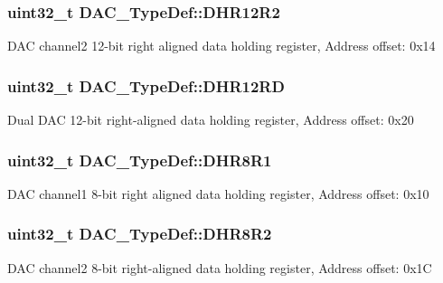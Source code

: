 \subsubsection[{\texorpdfstring{D\+H\+R12\+R2}{DHR12R2}}]{ uint32\+\_\+t D\+A\+C\+\_\+\+Type\+Def\+::\+D\+H\+R12\+R2}\hypertarget{struct_d_a_c___type_def_ab1f777540c487c26bf27e6fa37a644cc}{}\label{struct_d_a_c___type_def_ab1f777540c487c26bf27e6fa37a644cc}
D\+AC channel2 12-\/bit right aligned data holding register, Address offset\+: 0x14 
\subsubsection[{\texorpdfstring{D\+H\+R12\+RD}{DHR12RD}}]{ uint32\+\_\+t D\+A\+C\+\_\+\+Type\+Def\+::\+D\+H\+R12\+RD}\hypertarget{struct_d_a_c___type_def_affa5cc9fe0cc9eb594d703bdc9d9abd9}{}\label{struct_d_a_c___type_def_affa5cc9fe0cc9eb594d703bdc9d9abd9}
Dual D\+AC 12-\/bit right-\/aligned data holding register, Address offset\+: 0x20 
\subsubsection[{\texorpdfstring{D\+H\+R8\+R1}{DHR8R1}}]{ uint32\+\_\+t D\+A\+C\+\_\+\+Type\+Def\+::\+D\+H\+R8\+R1}\hypertarget{struct_d_a_c___type_def_a3a382d341fb608a04390bacb8c00b0f0}{}\label{struct_d_a_c___type_def_a3a382d341fb608a04390bacb8c00b0f0}
D\+AC channel1 8-\/bit right aligned data holding register, Address offset\+: 0x10 
\subsubsection[{\texorpdfstring{D\+H\+R8\+R2}{DHR8R2}}]{ uint32\+\_\+t D\+A\+C\+\_\+\+Type\+Def\+::\+D\+H\+R8\+R2}\hypertarget{struct_d_a_c___type_def_a3b096b71656f8fb32cd18b4c8b1d2334}{}\label{struct_d_a_c___type_def_a3b096b71656f8fb32cd18b4c8b1d2334}
D\+AC channel2 8-\/bit right-\/aligned data holding register, Address offset\+: 0x1C 

